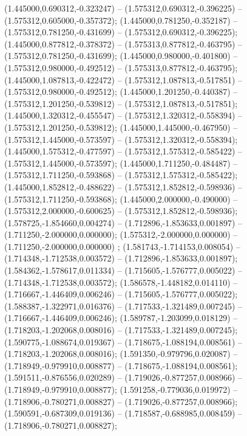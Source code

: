  (1.445000,0.690312,-0.323247) -- (1.575312,0.690312,-0.396225) -- (1.575312,0.605000,-0.357372);
 (1.445000,0.781250,-0.352187) -- (1.575312,0.781250,-0.431699) -- (1.575312,0.690312,-0.396225);
 (1.445000,0.877812,-0.378372) -- (1.575313,0.877812,-0.463795) -- (1.575312,0.781250,-0.431699);
 (1.445000,0.980000,-0.401800) -- (1.575312,0.980000,-0.492512) -- (1.575313,0.877812,-0.463795);
 (1.445000,1.087813,-0.422472) -- (1.575312,1.087813,-0.517851) -- (1.575312,0.980000,-0.492512);
 (1.445000,1.201250,-0.440387) -- (1.575312,1.201250,-0.539812) -- (1.575312,1.087813,-0.517851);
 (1.445000,1.320312,-0.455547) -- (1.575312,1.320312,-0.558394) -- (1.575312,1.201250,-0.539812);
 (1.445000,1.445000,-0.467950) -- (1.575312,1.445000,-0.573597) -- (1.575312,1.320312,-0.558394);
 (1.445000,1.575312,-0.477597) -- (1.575312,1.575312,-0.585422) -- (1.575312,1.445000,-0.573597);
 (1.445000,1.711250,-0.484487) -- (1.575312,1.711250,-0.593868) -- (1.575312,1.575312,-0.585422);
 (1.445000,1.852812,-0.488622) -- (1.575312,1.852812,-0.598936) -- (1.575312,1.711250,-0.593868);
 (1.445000,2.000000,-0.490000) -- (1.575312,2.000000,-0.600625) -- (1.575312,1.852812,-0.598936);
 (1.578725,-1.854660,0.004274) -- (1.712896,-1.853633,0.001897) -- (1.711250,-2.000000,0.000000);
 (1.575312,-2.000000,0.000000) -- (1.711250,-2.000000,0.000000) ;
 (1.581743,-1.714153,0.008054) -- (1.714348,-1.712538,0.003572) -- (1.712896,-1.853633,0.001897);
 (1.584362,-1.578617,0.011334) -- (1.715605,-1.576777,0.005022) -- (1.714348,-1.712538,0.003572);
 (1.586578,-1.448182,0.014110) -- (1.716667,-1.446409,0.006246) -- (1.715605,-1.576777,0.005022);
 (1.588387,-1.322971,0.016376) -- (1.717533,-1.321489,0.007245) -- (1.716667,-1.446409,0.006246);
 (1.589787,-1.203099,0.018129) -- (1.718203,-1.202068,0.008016) -- (1.717533,-1.321489,0.007245);
 (1.590775,-1.088674,0.019367) -- (1.718675,-1.088194,0.008561) -- (1.718203,-1.202068,0.008016);
 (1.591350,-0.979796,0.020087) -- (1.718949,-0.979910,0.008877) -- (1.718675,-1.088194,0.008561);
 (1.591511,-0.876556,0.020289) -- (1.719026,-0.877257,0.008966) -- (1.718949,-0.979910,0.008877);
 (1.591258,-0.779036,0.019972) -- (1.718906,-0.780271,0.008827) -- (1.719026,-0.877257,0.008966);
 (1.590591,-0.687309,0.019136) -- (1.718587,-0.688985,0.008459) -- (1.718906,-0.780271,0.008827);
